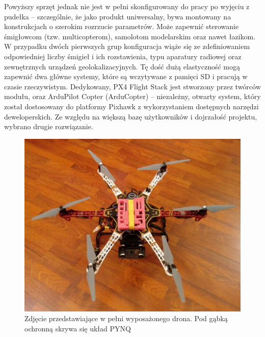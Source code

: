 Powyższy sprzęt jednak nie jest w pełni skonfigurowany do pracy po wyjęciu z pudełka -- szczególnie, że jako produkt uniwersalny, bywa montowany na konstrukcjach o szerokim rozrzucie parametrów. 
Może zapewnić sterowanie śmigłowcom (tzw. multicopterom), samolotom modelarskim oraz nawet łazikom. %
W przypadku dwóch pierwszych grup konfiguracja wiąże się ze zdefiniowaniem odpowiedniej liczby śmigieł i ich rozstawienia, typu aparatury radiowej oraz zewnętrznych urządzeń geolokalizacyjnych. 
Tę dość dużą elastyczność mogą zapewnić dwa główne systemy, które są wczytywane z pamięci SD i pracują w czasie rzeczywistym. 
Dedykowany, PX4 Flight Stack jest stworzony przez twórców modułu, oraz ArduPilot Copter (ArduCopter) -- niezależny, otwarty system, który został dostosowany do platformy Pixhawk z wykorzystaniem dostępnych narzędzi deweloperskich. 
Ze względu na większą bazę użytkowników i dojrzałość projektu, wybrano drugie rozwiązanie.

\begin{figure}[h]
	\centering
	\captionsetup{justification=centering,margin=1cm}
	\hspace*{0cm}
	\includegraphics[width=14cm]{5_drone_photo.jpg}
	\caption{Zdjęcie przedstawiające w pełni wyposażonego drona. Pod gąbką ochronną skrywa się układ PYNQ}
	\label{fig:drone_photo}
\end{figure}

